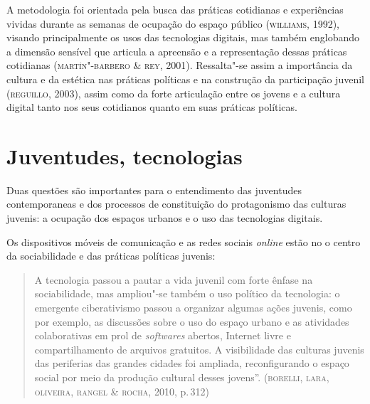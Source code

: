 A metodologia foi orientada pela busca das práticas cotidianas e
experiências vividas durante as semanas de ocupação do espaço público
(\textsc{williams}, 1992), visando principalmente os usos das tecnologias
digitais, mas também englobando a dimensão sensível que articula a
apreensão e a representação dessas práticas cotidianas (\textsc{martín"-barbero \&
rey}, 2001). Ressalta"-se assim a importância da cultura e da estética nas
práticas políticas e na construção da participação juvenil (\textsc{reguillo},
2003), assim como da forte articulação entre os jovens e a cultura
digital tanto nos seus cotidianos quanto em suas práticas políticas.

\section{Juventudes, tecnologias}

Duas questões são importantes para o entendimento das juventudes
contemporaneas e dos processos de constituição do protagonismo das
culturas juvenis: a ocupação dos espaços urbanos e o uso das tecnologias
digitais.

Os dispositivos móveis de comunicação e as redes sociais \emph{online} estão no
o centro da sociabilidade e das práticas políticas juvenis:

\begin{quote}
A tecnologia passou a pautar a vida juvenil com forte ênfase na
sociabilidade, mas ampliou"-se também o uso político da tecnologia: o
emergente ciberativismo passou a organizar algumas ações juvenis, como
por exemplo, as discussões sobre o uso do espaço urbano e as atividades
colaborativas em prol de \emph{softwares} abertos, Internet livre e
compartilhamento de arquivos gratuitos. A visibilidade das culturas
juvenis das periferias das grandes cidades foi ampliada, reconfigurando
o espaço social por meio da produção cultural desses jovens''. (\textsc{borelli,
lara, oliveira, rangel \& rocha}, 2010, p.\,312)
\end{quote}

